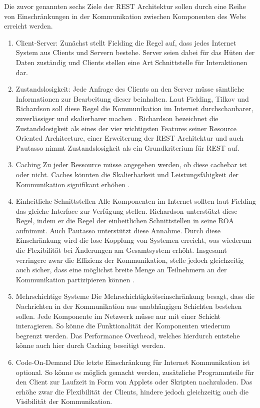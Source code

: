 Die zuvor genannten sechs Ziele der REST Architektur sollen durch eine Reihe von Einschränkungen in der Kommunikation zwischen Komponenten des Webs erreicht werden.

\begin{enumerate}
    \item Client-Server: Zunächst stellt Fielding die Regel auf, dass jedes Internet System aus Clients und Servern bestehe. Server seien dabei für das Hüten der Daten zuständig und Clients stellen eine Art Schnittstelle für Interaktionen dar.
    \item Zustandslosigkeit: Jede Anfrage des Clients an den Server müsse sämtliche Informationen zur Bearbeitung dieser beinhalten. Laut Fielding, Tilkov und Richardson soll diese Regel die Kommunikation im Internet durchschaubarer, zuverlässiger und skalierbarer machen   . Richardson bezeichnet die Zustandslosigkeit als eines der vier wichtigsten Features seiner Resource Oriented Architecture, einer Erweiterung der REST Architektur und auch Pautasso nimmt Zustandslosigkeit als ein Grundkriterium für REST auf. 
    \item Caching Zu jeder Ressource müsse angegeben werden, ob diese cachebar ist oder nicht. Caches könnten die Skalierbarkeit und Leistungsfähigkeit der Kommunikation signifikant erhöhen .
    \item Einheitliche Schnittstellen Alle Komponenten im Internet sollten laut Fielding das gleiche Interface zur Verfügung stellen. Richardson unterstützt diese Regel, indem er die Regel der einheitlichen Schnittstellen in seine ROA aufnimmt. Auch Pautasso unterstützt diese Annahme. Durch diese Einschränkung wird die lose Kopplung von Systemen erreicht, was wiederum die Flexibilität bei Änderungen am Gesamtsystem erhöht. Insgesamt verringere zwar die Effizienz der Kommunikation, stelle jedoch gleichzeitig auch sicher, dass eine möglichst breite Menge an Teilnehmern an der Kommunikation partizipieren können .
    \item Mehrschichtige Systeme Die Mehrschichtigkeitseinschränkung besagt, dass die Nachrichten in der Kommunikation aus unabhängigen Schichten bestehen sollen. Jede Komponente im Netzwerk müsse nur mit einer Schicht interagieren. So könne die Funktionalität der Komponenten wiederum begrenzt werden. Das Performance Overhead, welches hierdurch entstehe könne auch hier durch Caching beseitigt werden.
    \item Code-On-Demand Die letzte Einschränkung für Internet Kommunikation ist optional. So könne es möglich gemacht werden, zusätzliche Programmteile für den Client zur Laufzeit in Form von Applets oder Skripten nachzuladen. Das erhöhe zwar die Flexibilität der Clients, hindere jedoch gleichzeitig auch die Visibilität der Kommunikation.
\end{enumerate}

